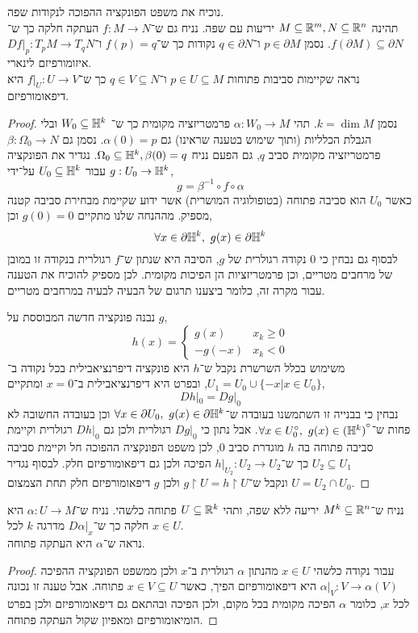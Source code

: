 \question{}
\subquestion{}
נוכיח את משפט הפונקציה ההפוכה לנקודות שפה. \\
תהינה $M \subseteq \mathbb{R}^m, N \subseteq \mathbb{R}^n$ יריעות עם שפה.
נניח גם ש־$f : M \to N$ העתקה חלקה כך ש־$f(\partial M) \subseteq \partial N$.
נסמן $p \in \partial M$ ו־$q \in \partial N$ נקודות כך ש־$f(p) = q$ ו־$D f |_p : T_p M \to T_q N$ איזומורפיזם לינארי. \\
נראה שקיימות סביבות פתוחות $p \in U \subseteq M$ ו־$q \in V \subseteq N$ כך ש־$f |_U : U \to V$ היא דיפאומורפיזם.
\begin{proof}
	נסמן $k = \dim M$.
	תהי $\alpha : W_0 \to M$ פרמטריזציה מקומית כך ש־ $W_0 \subseteq \mathbb{H}^k$ ובלי הגבלת הכלליות (ותוך שימוש בטענה שראינו) גם $\alpha(0) = p$.
	נסמן גם $\beta : \Omega_0 \to N$ פרמטריזציה מקומית סביב $q$, גם הפעם נניח $\Omega_0 \subseteq \mathbb{H}^k, \beta(0) = q$.
	נגדיר את הפונקציה $g : U_0 \to \mathbb{H}^k$ עבור $U_0 \subseteq \mathbb{H}^k$ על־ידי,
	\[
		g = \beta^{-1} \circ f \circ \alpha
	\]
	כאשר $U_0$ הוא סביבה פתוחה (בטופולוגיה המושרית) אשר ידוע שקיימת מבחירת סביבה קטנה מספיק.
	מההנחה שלנו מתקיים $g(0) = 0$ וכן,
	\[
		\forall x \in \partial \HH^k,\ 
		g(x) \in \partial \HH^k
	\]
	לבסוף גם נבחין כי $0$ נקודה רגולרית של $g$, הסיבה היא שנתון ש־$f$ רגולרית בנקודה זו במובן של מרחבים מטריים, וכן פרמטריזציות הן הפיכות מקומית.
	לכן מספיק להוכיח את הטענה עבור מקרה זה, כלומר ביצענו תרגום של הבעיה לבעיה במרחבים מטריים.

	נבנה פונקציה חדשה המבוססת על $g$,
	\[
		h(x)
		= \begin{cases}
			g(x) & x_k \ge 0 \\
			- g(-x) & x_k < 0
		\end{cases}
	\]
	משימוש בכלל השרשרת נקבל ש־$h$ היא פונקציה דיפרנציאבילית בכל נקודה ב־$U_1 = U_0 \cup \{ -x | x \in U_0 \}$, ובפרט היא דיפרנציאבילית ב־$x = 0$ ומתקיים,
	\[
		D h |_0
		= D g |_0
	\]
	נבחין כי בבנייה זו השתמשנו בעובדה ש־$\forall x \in \partial U_0,\ g(x) \in \partial \HH^k$ וכן בעובדה החשובה לא פחות ש־$\forall x \in U_0^\circ,\ g(x) \in {(\mathbb{H}^k)}^\circ$.
	אבל נתון כי $D g |_0$ רגולרית ולכן גם $D h |_0$ רגולרית וקיימת סביבה פתוחה בה $h$ מוגדרת סביב $0$, לכן משפט הפונקציה ההפוכה חל וקיימת סביבה $U_2 \subseteq U_1$ כך ש־$h |_{U_2} : U_2 \to U_2$ הפיכה ולכן גם דיפאומורפיזם חלק.
	לבסוף נגדיר $U = U_2 \cap U_0$ ונקבל ש־$g \restriction U = h \restriction U$ ולכן $g$ דיפאומורפיזם חלק תחת הצמצום.
\end{proof}

\subquestion{}
נניח ש־$M^k \subseteq \mathbb{R}^n$ יריעה ללא שפה,
ותהי $U \subseteq \mathbb{R}^k$ פתוחה כלשהי.
נניח ש־$\alpha : U \to M$ היא חלקה כך ש־$D \alpha |_x$ מדרגה $k$ לכל $x \in U$. \\
נראה ש־$\alpha$ היא העתקה פתוחה.
\begin{proof}
	עבור נקודה כלשהי $x \in U$ מהנתון $\alpha$ רגולרית ב־$x$ ולכן ממשפט הפונקציה ההפיכה $\alpha |_V : V \to \alpha(V)$ היא דיפאומורפיזם הפיך, כאשר $x \in V \subseteq U$ פתוחה.
	אבל טענה זו נכונה לכל $x$, כלומר $\alpha$ הפיכה מקומית בכל מקום, ולכן הפיכה ובהתאם גם דיפאומורפיזם ולכן בפרט הומיאומורפיזם ומאפיון שקול העתקה פתוחה.
\end{proof}

